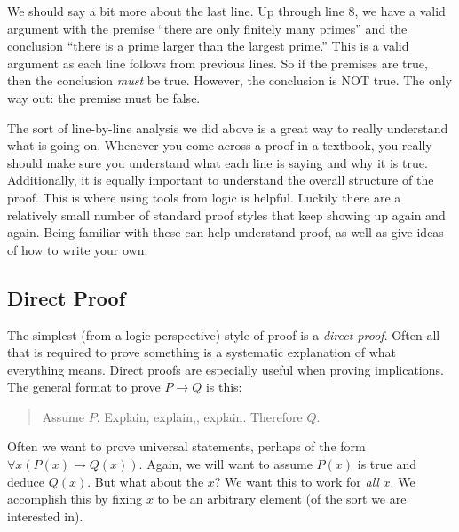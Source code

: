 \documentclass[10pt,]{book}
\theoremstyle{plain}
\theoremstyle{definition}
\theoremstyle{definition}
\theoremstyle{definition}
\numberwithin{equation}{chapter}
\def\imp{\rightarrow}
\begin{document}
We should say a bit more about the last line. Up through line 8, we have a valid argument with the premise ``there are only finitely many primes'' and the conclusion ``there is a prime larger than the largest prime.'' This is a valid argument as each line follows from previous lines. So if the premises are true, then the conclusion \emph{must} be true. However, the conclusion is NOT true. The only way out: the premise must be false.
%
\par

The sort of line-by-line analysis we did above is a great way to really understand what is going on. Whenever you come across a proof in a textbook, you really should make sure you understand what each line is saying and why it is true. Additionally, it is equally important to understand the overall structure of the proof. This is where using tools from logic is helpful. Luckily there are a relatively small number of standard proof styles that keep showing up again and again. Being familiar with these can help understand proof, as well as give ideas of how to write your own.
%
\typeout{************************************************}
\typeout{************************************************}
\subsection[Direct Proof]{Direct Proof}\label{subsection-32}

%
\par

The simplest (from a logic perspective) style of proof is a \emph{direct proof}. Often all that is required to prove something is a systematic explanation of what everything means. Direct proofs are especially useful when proving implications. The general format to prove \(P \imp Q\) is this:
%
\begin{quote}
Assume \(P\).  Explain, explain,, explain.  Therefore \(Q\).
\end{quote}
\par

Often we want to prove universal statements, perhaps of the form \(\forall x (P(x) \imp Q(x))\). Again, we will want to assume \(P(x)\) is true and deduce \(Q(x)\). But what about the \(x\)? We want this to work for \emph{all} \(x\). We accomplish this by fixing \(x\) to be an arbitrary element (of the sort we are interested in).
%
\par
\end{document}
